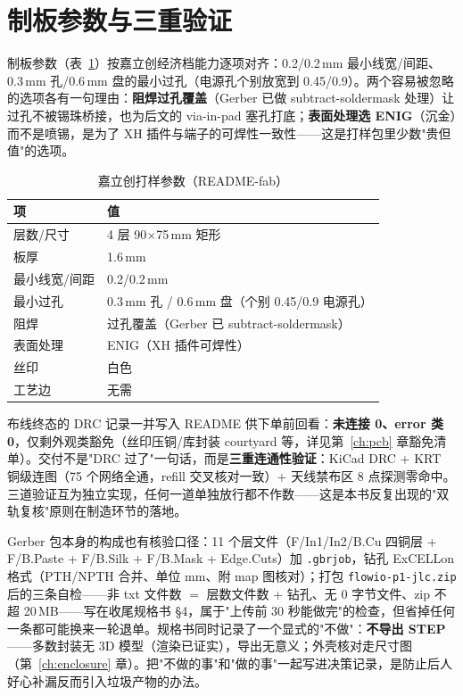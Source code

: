 \section{制板参数与三重验证}
\label{sec:fab-params}

制板参数（表~\ref{tab:fab-params}）按嘉立创经济档能力逐项对齐：0.2/0.2\,mm 最小线宽/间距、0.3\,mm 孔/0.6\,mm 盘的最小过孔（电源孔个别放宽到 0.45/0.9）。两个容易被忽略的选项各有一句理由：\textbf{阻焊过孔覆盖}（Gerber 已做 subtract-soldermask 处理）让过孔不被锡珠桥接，也为后文的 via-in-pad 塞孔打底；\textbf{表面处理选 ENIG}（沉金）而不是喷锡，是为了 XH 插件与端子的可焊性一致性——这是打样包里少数"贵但值"的选项。

\begin{table}[htbp]
  \centering
  \caption{嘉立创打样参数（README-fab）}
  \label{tab:fab-params}
  \begin{tabular}{ll}
    \toprule
    项 & 值 \\
    \midrule
    层数/尺寸 & 4 层 90$\times$75\,mm 矩形 \\
    板厚 & 1.6\,mm \\
    最小线宽/间距 & 0.2/0.2\,mm \\
    最小过孔 & 0.3\,mm 孔 / 0.6\,mm 盘（个别 0.45/0.9 电源孔） \\
    阻焊 & 过孔覆盖（Gerber 已 subtract-soldermask） \\
    表面处理 & ENIG（XH 插件可焊性） \\
    丝印 & 白色 \\
    工艺边 & 无需 \\
    \bottomrule
  \end{tabular}
\end{table}

布线终态的 DRC 记录一并写入 README 供下单前回看：\textbf{未连接 0、error 类 0}，仅剩外观类豁免（丝印压铜/库封装 courtyard 等，详见第~\ref{ch:pcb} 章豁免清单）。交付不是"DRC 过了"一句话，而是\textbf{三重连通性验证}：KiCad DRC + KRT 铜级连图（75 个网络全通，refill 交叉核对一致）+ 天线禁布区 8 点探测零命中。三道验证互为独立实现，任何一道单独放行都不作数——这是本书反复出现的"双轨复核"原则在制造环节的落地。

Gerber 包本身的构成也有核验口径：11 个层文件（F/In1/In2/B.Cu 四铜层 + F/B.Paste + F/B.Silk + F/B.Mask + Edge.Cuts）加 \texttt{.gbrjob}，钻孔 ExCELLon 格式（PTH/NPTH 合并、单位 mm、附 map 图核对）；打包 \texttt{flowio-p1-jlc.zip} 后的三条自检——非 txt 文件数 $=$ 层数文件数 + 钻孔、无 0 字节文件、zip 不超 20\,MB——写在收尾规格书 \S4，属于"上传前 30 秒能做完"的检查，但省掉任何一条都可能换来一轮退单。规格书同时记录了一个显式的"不做"：\textbf{不导出 STEP}——多数封装无 3D 模型（渲染已证实），导出无意义；外壳核对走尺寸图（第~\ref{ch:enclosure} 章）。把"不做的事"和"做的事"一起写进决策记录，是防止后人好心补漏反而引入垃圾产物的办法。


